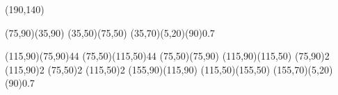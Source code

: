 \documentclass{standalone}
\begin{document}
\begin{axopicture}(190,140)

  \Line[arrow](75,90)(35,90)      %
  \Line[arrow](35,50)(75,50)      %
  \GOval(35,70)(5,20)(90){0.7}    %
                                  
  \Photon(115,90)(75,90){4}{4}    %
  \Photon(75,50)(115,50){4}{4}    %
  \Line[arrow](75,50)(75,90)      %
  \Line[arrow](115,90)(115,50)    %
  \Vertex(75,90){2}               %
  \Vertex(115,90){2}              %
  \Vertex(75,50){2}               %
  \Vertex(115,50){2}              %
  \Line[arrow](155,90)(115,90)    %
  \Line[arrow](115,50)(155,50)    %
  \GOval(155,70)(5,20)(90){0.7}   %
                                  
\end{axopicture}
\end{document}
